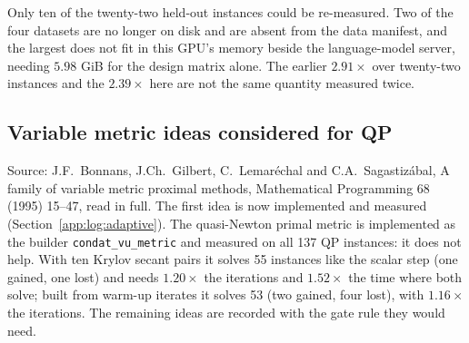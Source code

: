 Only ten of the twenty-two held-out instances could be re-measured. Two of the four
datasets are no longer on disk and are absent from the data manifest, and the largest
does not fit in this GPU's memory beside the language-model server, needing
$5.98$ GiB for the design matrix alone. The earlier $2.91\times$ over twenty-two
instances and the $2.39\times$ here are not the same quantity measured twice.

\subsection{Variable metric ideas considered for QP}
\label{app:log:varmetric}

Source: J.F.~Bonnans, J.Ch.~Gilbert, C.~Lemar\'echal and C.A.~Sagastiz\'abal, A
family of variable metric proximal methods, Mathematical Programming 68
(1995) 15--47, read in full. The first idea is now implemented and measured
(Section~\ref{app:log:adaptive}). The quasi-Newton primal metric is implemented as
the builder \texttt{condat\_vu\_metric} and measured on all 137 QP instances: it does not
help. With ten Krylov secant pairs it solves 55 instances like the scalar step (one
gained, one lost) and needs $1.20\times$ the iterations and $1.52\times$ the time where
both solve; built from warm-up iterates it solves 53 (two gained, four lost), with
$1.16\times$ the iterations. The remaining ideas are recorded with the gate rule they
would need.

